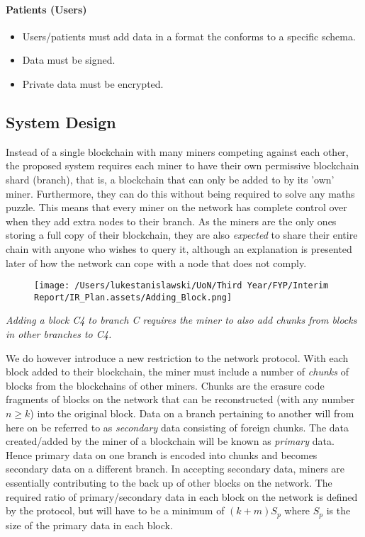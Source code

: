 \documentclass[]{article}
\let\oldparagraph\paragraph
\renewcommand{\paragraph}[1]{\oldparagraph{#1}\mbox{}}
\begin{document}
\hypertarget{header-n68}{%
\paragraph{Patients (Users)}\label{header-n68}}

\begin{itemize}
\item
  Users/patients must add data in a format the conforms to a specific
  schema.
\item
  Data must be signed.
\item
  Private data must be encrypted.
\end{itemize}

\hypertarget{header-n76}{%
\subsection{System Design}\label{header-n76}}

Instead of a single blockchain with many miners competing against each
other, the proposed system requires each miner to have their own
permissive blockchain shard (branch), that is, a blockchain that can
only be added to by its 'own' miner. Furthermore, they can do this
without being required to solve any maths puzzle. This means that every
miner on the network has complete control over when they add extra nodes
to their branch. As the miners are the only ones storing a full copy of
their blockchain, they are also \emph{expected} to share their entire
chain with anyone who wishes to query it, although an explanation is
presented later of how the network can cope with a node that does not
comply.

\begin{figure}
\centering
\texttt{[image: /Users/lukestanislawski/UoN/Third Year/FYP/Interim Report/IR\_Plan.assets/Adding\_Block.png]}
\caption{}
\end{figure}

\emph{Adding a block C4 to branch C requires the miner to also add
chunks from blocks in other branches to C4.}

We do however introduce a new restriction to the network protocol. With
each block added to their blockchain, the miner must include a number of
\emph{chunks} of blocks from the blockchains of other miners. Chunks are
the erasure code fragments of blocks on the network that can be
reconstructed (with any number \(n \geq k\)) into the original block.
Data on a branch pertaining to another will from here on be referred to
as \emph{secondary} data consisting of foreign chunks. The data
created/added by the miner of a blockchain will be known as
\emph{primary} data. Hence primary data on one branch is encoded into
chunks and becomes secondary data on a different branch. In accepting
secondary data, miners are essentially contributing to the back up of
other blocks on the network. The required ratio of primary/secondary
data in each block on the network is defined by the protocol, but will
have to be a minimum of \((k + m) S_{p}\) where \(S_{p}\) is the size of
the primary data in each block.
\end{document}

